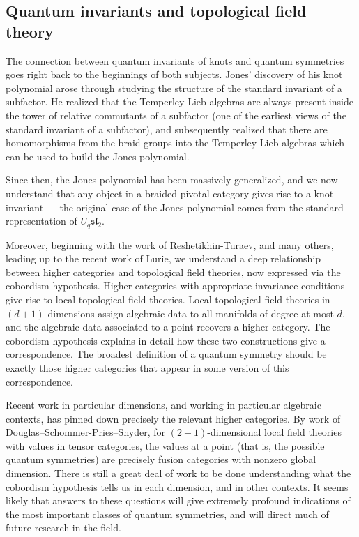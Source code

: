 \documentclass[12pt]{article}
\begin{document}
\subsection{Quantum invariants and topological field theory}
The connection between quantum invariants of knots and quantum symmetries goes right back to the beginnings of both subjects. Jones' discovery of his knot polynomial arose through studying the structure of the standard invariant of a subfactor. He
realized that the Temperley-Lieb algebras are always present inside the tower of relative commutants of a subfactor (one of the earliest views of the standard invariant of a subfactor),
and subsequently realized that there are homomorphisms from the braid groups into the Temperley-Lieb algebras which can be used to build the Jones polynomial.

Since then, the Jones polynomial has been massively generalized, and we now understand that any object in a braided pivotal category gives rise to a knot invariant --- the original case of the Jones polynomial comes from the standard representation of $U_q \mathfrak{sl}_2$.

Moreover, beginning with the work of Reshetikhin-Turaev, and many others, leading up to the recent work of Lurie, we understand a deep relationship between higher categories and  topological field theories, now expressed via the cobordism hypothesis. Higher categories with appropriate invariance conditions give rise to local topological field theories. Local topological field theories in $(d+1)$-dimensions assign algebraic data to all manifolds of degree at most $d$, and the algebraic data associated to a point recovers a higher category. The cobordism hypothesis explains in detail how these two constructions give a correspondence. The broadest definition of a quantum symmetry should be exactly those higher categories that appear in some version of this correspondence.

Recent work in particular dimensions, and working in particular algebraic contexts, has pinned down precisely the relevant higher categories. By work of Douglas--Schommer-Pries--Snyder, for $(2+1)$-dimensional local field theories with values in tensor categories, the values at a point (that is, the possible quantum symmetries) are precisely fusion categories with nonzero global dimension. There is still a great deal of work
to be done understanding what the cobordism hypothesis tells us in each dimension, and in other contexts. It seems likely that answers to these questions will give extremely profound indications of the most important classes of quantum symmetries, and will direct much of future research in the field.
\end{document}
